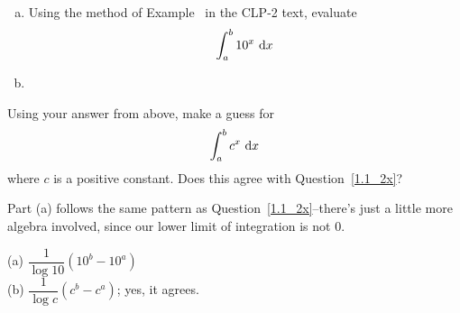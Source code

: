 \begin{question}
\begin{enumerate}[(a)]
\item Using the method of Example~ in the CLP-2 text, evaluate
\[\int_a^b 10^x \ \mathrm{d}x\]
\item
\end{enumerate} Using your answer from above, make a guess for
\[\int_a^b c^x \ \mathrm{d}x\]
where $c$ is a positive constant. Does this agree with Question~\ref{1.1_2x}?
\end{question}
\begin{hint}
Part (a) follows  the same pattern as Question~\ref{1.1_2x}--there's just a little more algebra involved, since our lower limit of integration is not 0.
\end{hint}
\begin{answer}
(a) $\dfrac{1}{\log 10}\left(10^b-10^a\right)$\\
(b) $\dfrac{1}{\log c}\left(c^b-c^a\right)$; yes, it agrees.
\end{answer}
